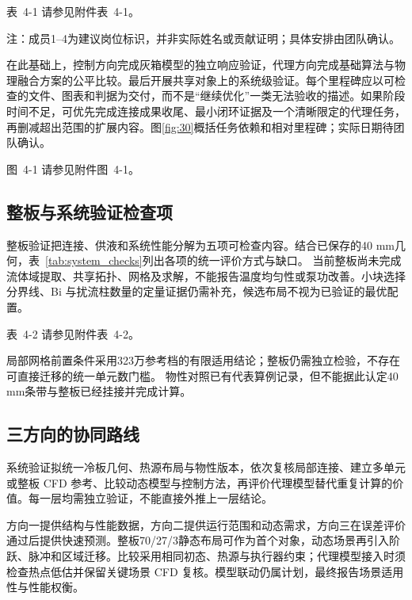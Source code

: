 \documentclass[UTF8]{midterm}
\makeatletter
\newcommand{\submissionnumber}[1]{\def\@currentlabel{#1}}
\makeatother
\begin{document}
\par\noindent \begingroup\submissionnumber{4-1}\label{tab:16}\endgroup 表~4-1 请参见附件表~4-1。\par

\endgroup
\noindent\footnotesize 注：成员1--4为建议岗位标识，并非实际姓名或贡献证明；具体安排由团队确认。\normalsize

在此基础上，控制方向完成灰箱模型的独立响应验证，代理方向完成基础算法与物理融合方案的公平比较。最后开展共享对象上的系统级验证。每个里程碑应以可检查的文件、图表和判据为交付，而不是“继续优化”一类无法验收的描述。如果阶段时间不足，可优先完成连接成果收尾、最小闭环证据及一个清晰限定的代理任务，再删减超出范围的扩展内容。图\ref{fig:30}概括任务依赖和相对里程碑；实际日期待团队确认。

\par\noindent \begingroup\submissionnumber{4-1}\label{fig:30}\endgroup 图~4-1 请参见附件图~4-1。\par



\subsection{整板与系统验证检查项}
整板验证把连接、供液和系统性能分解为五项可检查内容。结合已保存的40 mm几何，表~\ref{tab:system_checks}列出各项的统一评价方式与缺口。
当前整板尚未完成流体域提取、共享拓扑、网格及求解，不能报告温度均匀性或泵功改善。小块选择分界线、Bi 与扰流柱数量的定量证据仍需补充，候选布局不视为已验证的最优配置。

\par\noindent \begingroup\submissionnumber{4-2}\label{tab:system_checks}\endgroup 表~4-2 请参见附件表~4-2。\par

局部网格前置条件采用323万参考档的有限适用结论；整板仍需独立检验，不存在可直接迁移的统一单元数门槛。
物性对照已有代表算例记录，但不能据此认定40 mm条带与整板已经挂接并完成计算\cite{stagereports}。
\subsection{三方向的协同路线}

系统验证拟统一冷板几何、热源布局与物性版本，依次复核局部连接、建立多单元或整板 CFD 参考、比较动态模型与控制方法，再评价代理模型替代重复计算的价值。每一层均需独立验证，不能直接外推上一层结论。

方向一提供结构与性能数据，方向二提供运行范围和动态需求，方向三在误差评价通过后提供快速预测。整板70/27/3静态布局可作为首个对象，动态场景再引入阶跃、脉冲和区域迁移。比较采用相同初态、热源与执行器约束；代理模型接入时须检查热点低估并保留关键场景 CFD 复核。模型联动仍属计划，最终报告场景适用性与性能权衡。
\end{document}
